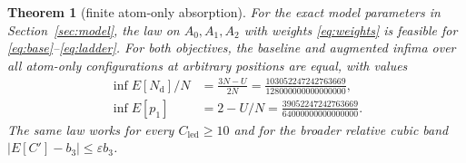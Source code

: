 \documentclass[11pt]{article}
\newtheorem{theorem}{Theorem}[section]
\theoremstyle{definition}\newtheorem{definition}[theorem]{Definition}
\theoremstyle{remark}\newtheorem{remark}[theorem]{Remark}
\newcommand{\Nd}{N_{\mathrm d}}\newcommand{\one}{\mathbf 1}
\begin{document}
\begin{theorem}[finite atom-only absorption]\label{thm:main}
For the exact model parameters in Section~\ref{sec:model}, the law on
$A_0,A_1,A_2$ with weights \eqref{eq:weights} is feasible for
\eqref{eq:base}--\eqref{eq:ladder}. For both objectives, the baseline and
augmented infima over \emph{all atom-only configurations at arbitrary
positions} are equal, with values
\begin{align*}
 \inf E[\Nd]/N&=\frac{3N-U}{2N}
 =\frac{103052247242763669}{128000000000000000},\\
 \inf E[p_1]&=2-U/N
 =\frac{39052247242763669}{64000000000000000}.
\end{align*}
The same law works for every $C_{\mathrm{led}}\ge10$ and for the broader
relative cubic band $|E[C']-b_3|\le\varepsilon b_3$.
\end{theorem}
\end{document}
